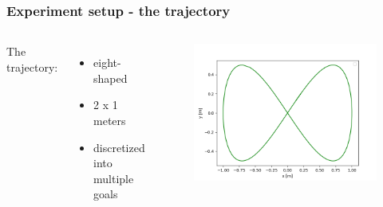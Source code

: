 \documentclass{beamer}
\begin{document}
\begin{frame}
\frametitle{Experiment setup - the trajectory}

\begin{columns}


The trajectory:
\begin{itemize}
  \item eight-shaped
  \item 2 x 1 meters
  \item discretized into multiple goals
\end{itemize}



\begin{figure}[H]
    \centering
    \includegraphics[scale=0.32]{img/other/reference_trajectory.png}
\end{figure}

\end{columns}

\end{frame}

\end{document}
